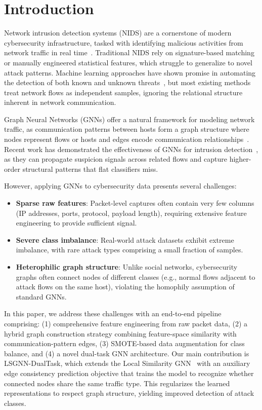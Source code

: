 \documentclass[conference]{IEEEtran}
\begin{document}
\section{Introduction}

Network intrusion detection systems (NIDS) are a cornerstone of modern cybersecurity infrastructure, tasked with identifying malicious activities from network traffic in real time~\cite{buczak2016survey}. Traditional NIDS rely on signature-based matching or manually engineered statistical features, which struggle to generalize to novel attack patterns. Machine learning approaches have shown promise in automating the detection of both known and unknown threats~\cite{ahmad2021network}, but most existing methods treat network flows as independent samples, ignoring the relational structure inherent in network communication.

Graph Neural Networks (GNNs) offer a natural framework for modeling network traffic, as communication patterns between hosts form a graph structure where nodes represent flows or hosts and edges encode communication relationships~\cite{zhou2020graph}. Recent work has demonstrated the effectiveness of GNNs for intrusion detection~\cite{lo2022graphsage_ids, chang2021gnn_nids}, as they can propagate suspicion signals across related flows and capture higher-order structural patterns that flat classifiers miss.

However, applying GNNs to cybersecurity data presents several challenges:
\begin{itemize}
    \item \textbf{Sparse raw features}: Packet-level captures often contain very few columns (IP addresses, ports, protocol, payload length), requiring extensive feature engineering to provide sufficient signal.
    \item \textbf{Severe class imbalance}: Real-world attack datasets exhibit extreme imbalance, with rare attack types comprising a small fraction of samples.
    \item \textbf{Heterophilic graph structure}: Unlike social networks, cybersecurity graphs often connect nodes of different classes (e.g., normal flows adjacent to attack flows on the same host), violating the homophily assumption of standard GNNs.
\end{itemize}

In this paper, we address these challenges with an end-to-end pipeline comprising: (1) comprehensive feature engineering from raw packet data, (2) a hybrid graph construction strategy combining feature-space similarity with communication-pattern edges, (3) SMOTE-based data augmentation for class balance, and (4) a novel dual-task GNN architecture. Our main contribution is LSGNN-DualTask, which extends the Local Similarity GNN~\cite{wu2023lsgnn} with an auxiliary edge consistency prediction objective that trains the model to recognize whether connected nodes share the same traffic type. This regularizes the learned representations to respect graph structure, yielding improved detection of attack classes.
\end{document}
